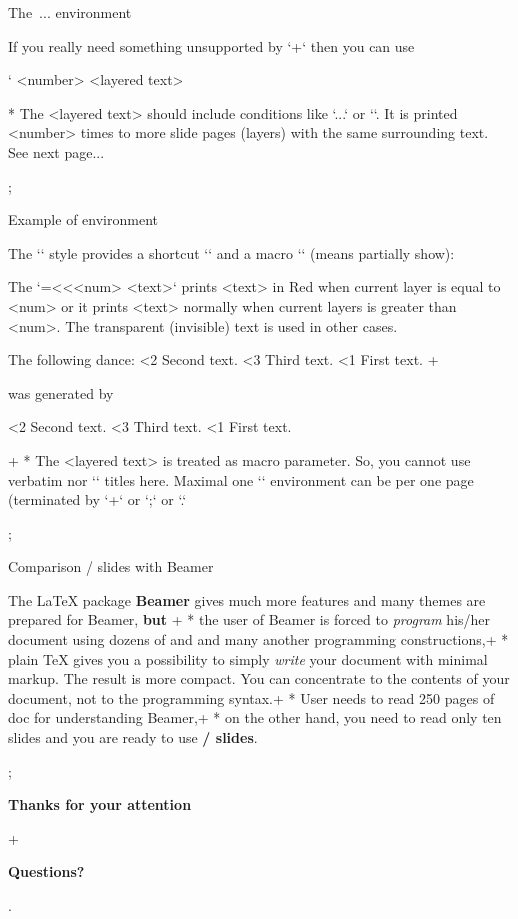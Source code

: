 \sec The \code{\\layers}\,...\code{\\endlayers} environment

If you really need something unsupported by `\pg+` then you can use 

\begtt \catcode`
\layers <number>
<layered text>
\endlayers
\endtt 

* The <layered text> should include conditions like
  `\ifnum\layernum...` or `\ifcase\layernum`. 
  It is printed <number> times to more slide pages (layers) with the same
  surrounding text. See next page... 

\pg; %

\sec Example of \code{\\layers} environment

The `\slides` style provides a shortcut `\use` and a macro `\pshow` (means
partially show):

\begtt
\def\use#1#2{\ifnum\layernum#1\relax#2\fi}
\def\pshow#1{\use{=#1}\Red \use{<#1}\Transparent \ignorespaces}
\endtt

The `{\pshow<num> <text>}` prints <text> in Red when current layer is equal
to <num> or it prints <text> normally when current layers is greater than <num>.
The transparent (invisible) text is used in other cases.

The following dance:
{\pshow2 Second text.} {\pshow3 Third text.} {\pshow1 First text.} 
\endlayers
\pg+

was generated by

\begtt
{}
{\pshow2 Second text.} {\pshow3 Third text.} {\pshow1 First text.} 
\endlayers
\endtt

\pg+
* The <layered text> is treated as macro parameter. So, you cannot use verbatim
  nor `\sec` titles here. Maximal one `\layers` environment can be per one 
  page (terminated by `\pg+` or `\pg;` or `\pg.`

\pg; %

\sec Comparison \OpTeX/ slides with Beamer

The \LaTeX{} package {\bf\Blue Beamer} gives much more features and many themes
are prepared for Beamer, {\bf\Red but}
\pg+
* the user of Beamer is forced to {\em program} his/her document using 
  dozens of \code{\\begin{foo}} and \code{\\end{foo}} and many another
  programming constructions,\pg+
* plain \TeX{} gives you a possibility to simply 
  {\em write} your document with minimal markup. The result is more compact.
  You can concentrate to the contents of your document, not to the
  programming syntax.\pg+
* User needs to read 250 pages of doc for understanding Beamer,\pg+
* on the other hand, you need to read only ten 
  slides
  and you are ready to use {\bf\Blue\OpTeX/ slides}.

\pg; %

\null
\vskip2cm
\centerline{\typosize[35/40]\bf Thanks for your attention}\pg+

\vskip2cm
\centerline{\Blue\typosize[60/70]\bf Questions?}

\pg. %

